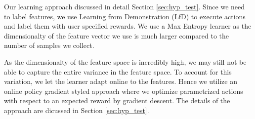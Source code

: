 Our learning approach discussed in detail Section \ref{sec:hyp_test}. Since we need to label features, we use Learning from Demonstration (LfD) to execute actions and label them with user specified rewards. We use a Max Entropy learner as the dimensionalty of the feature vector we use is much larger compared to the number of samples we collect.

As the dimensionalty of the feature space is incredibly high, we may still not be able to capture the entire variance in the feature space. To account for this variation, we let the learner adapt online to the features. Hence we utilize an online policy gradient styled approach where we optimize parametrized actions with respect to an expected reward by gradient descent. The details of the approach are dicussed in Section \ref{sec:hyp_test}.




